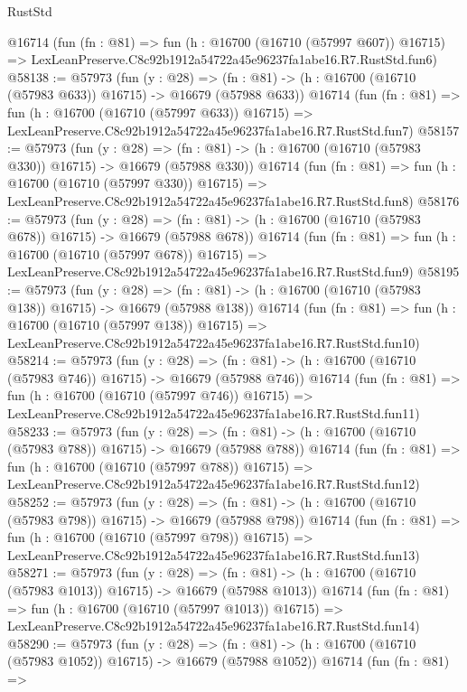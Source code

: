 \begin{lexlean}{RustStd}
\begin{coremodule}
    @16714
    (fun (fn : @81) =>
    fun (h : @16700 (@16710 (@57997 @607)) @16715) =>
    LexLeanPreserve.C8c92b1912a54722a45e96237fa1abe16.R7.RustStd.fun6)
@58138 := @57973
    (fun (y : @28) =>
    (fn : @81) -> (h : @16700 (@16710 (@57983 @633)) @16715) -> @16679 (@57988 @633))
    @16714
    (fun (fn : @81) =>
    fun (h : @16700 (@16710 (@57997 @633)) @16715) =>
    LexLeanPreserve.C8c92b1912a54722a45e96237fa1abe16.R7.RustStd.fun7)
@58157 := @57973
    (fun (y : @28) =>
    (fn : @81) -> (h : @16700 (@16710 (@57983 @330)) @16715) -> @16679 (@57988 @330))
    @16714
    (fun (fn : @81) =>
    fun (h : @16700 (@16710 (@57997 @330)) @16715) =>
    LexLeanPreserve.C8c92b1912a54722a45e96237fa1abe16.R7.RustStd.fun8)
@58176 := @57973
    (fun (y : @28) =>
    (fn : @81) -> (h : @16700 (@16710 (@57983 @678)) @16715) -> @16679 (@57988 @678))
    @16714
    (fun (fn : @81) =>
    fun (h : @16700 (@16710 (@57997 @678)) @16715) =>
    LexLeanPreserve.C8c92b1912a54722a45e96237fa1abe16.R7.RustStd.fun9)
@58195 := @57973
    (fun (y : @28) =>
    (fn : @81) -> (h : @16700 (@16710 (@57983 @138)) @16715) -> @16679 (@57988 @138))
    @16714
    (fun (fn : @81) =>
    fun (h : @16700 (@16710 (@57997 @138)) @16715) =>
    LexLeanPreserve.C8c92b1912a54722a45e96237fa1abe16.R7.RustStd.fun10)
@58214 := @57973
    (fun (y : @28) =>
    (fn : @81) -> (h : @16700 (@16710 (@57983 @746)) @16715) -> @16679 (@57988 @746))
    @16714
    (fun (fn : @81) =>
    fun (h : @16700 (@16710 (@57997 @746)) @16715) =>
    LexLeanPreserve.C8c92b1912a54722a45e96237fa1abe16.R7.RustStd.fun11)
@58233 := @57973
    (fun (y : @28) =>
    (fn : @81) -> (h : @16700 (@16710 (@57983 @788)) @16715) -> @16679 (@57988 @788))
    @16714
    (fun (fn : @81) =>
    fun (h : @16700 (@16710 (@57997 @788)) @16715) =>
    LexLeanPreserve.C8c92b1912a54722a45e96237fa1abe16.R7.RustStd.fun12)
@58252 := @57973
    (fun (y : @28) =>
    (fn : @81) -> (h : @16700 (@16710 (@57983 @798)) @16715) -> @16679 (@57988 @798))
    @16714
    (fun (fn : @81) =>
    fun (h : @16700 (@16710 (@57997 @798)) @16715) =>
    LexLeanPreserve.C8c92b1912a54722a45e96237fa1abe16.R7.RustStd.fun13)
@58271 := @57973
    (fun (y : @28) =>
    (fn : @81) -> (h : @16700 (@16710 (@57983 @1013)) @16715) -> @16679 (@57988 @1013))
    @16714
    (fun (fn : @81) =>
    fun (h : @16700 (@16710 (@57997 @1013)) @16715) =>
    LexLeanPreserve.C8c92b1912a54722a45e96237fa1abe16.R7.RustStd.fun14)
@58290 := @57973
    (fun (y : @28) =>
    (fn : @81) -> (h : @16700 (@16710 (@57983 @1052)) @16715) -> @16679 (@57988 @1052))
    @16714
    (fun (fn : @81) =>

\end{coremodule}
\end{lexlean}
